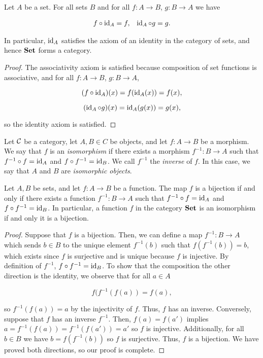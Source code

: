 \begin{lem}\label{identity-lemma} Let $A$ be a set. For all sets $B$ and for all $f:A\to B$, $g:B\to A$ we have

\begin{align*}
f\circ \operatorname{id}_{A}=f, && \operatorname{id}_{A}\circ g = g.
\end{align*}

In particular, $\operatorname{id}_A$ satisfies the axiom of an identity in the category of sets, and hence ${\bf Set}$ forms a category.
\end{lem}
\begin{proof} The associativity axiom is satisfied because composition of set functions is associative, and for all $f:A\to B$, $g:B\to A$,

$$(f\circ \operatorname{id}_{A})(x)=f(\operatorname{id}_{A}(x))=f(x),$$

$$(\operatorname{id}_{A}\circ g)(x)=\operatorname{id}_{A}(g(x))=g(x),$$

so the identity axiom is satisfied.
\end{proof}

\begin{defn}[Isomorphism] Let ${\mathcal C}$ be a category, let $A,B\in C$ be objects, and let $f:A\to B$ be a morphism. We say that $f$ is an {\em isomorphism} if there exists a morphism $f^{-1}:B\to A$ such that $f^{-1}\circ f= \operatorname{id}_A$ and $f\circ f^{-1}=\operatorname{id}_B$. We call $f^{-1}$ the {\em inverse} of $f$. In this case, we say that $A$ and $B$ are {\em isomorphic objects}.

\raggedleft\qedsymbol{}
\end{defn}

\begin{lem} Let $A,B$ be sets, and let $f:A\to B$ be a function. The map $f$ is a bijection if and only if there exists a function $f^{-1}: B\to A$ such that $f^{-1}\circ f= \operatorname{id}_A$ and $f\circ f^{-1}=\operatorname{id}_B$. In particular, a function $f$ in the category ${\bf Set}$ is an isomorphism if and only it is a bijection.
\end{lem}
\begin{proof} Suppose that $f$ is a bijection. Then, we can define a map $f^{-1}:B\to A$ which sends $b\in B$ to the unique element $f^{-1}(b)$ such that $f(f^{-1}(b))=b$, which exists since $f$ is surjective and is unique because $f$ is injective. By definition of $f^{-1}$, $f\circ f^{-1}=\operatorname{id}_{B}$. To show that the composition the other direction is the identity, we observe that for all $a\in A$

$$f(f^{-1}(f(a))=f(a),$$

so $f^{-1}(f(a))=a$ by the injectivity of $f$. Thus, $f$ has an inverse. Conversely, suppose that $f$ has an inverse $f^{-1}$. Then, $f(a)=f(a')$ implies $a=f^{-1}(f(a))=f^{-1}(f(a'))=a'$ so $f$ is injective. Additionally, for all $b\in B$ we have $b=f(f^{-1}(b))$ so $f$ is surjective. Thus, $f$ is a bijection. We have proved both directions, so our proof is complete.
\end{proof}

